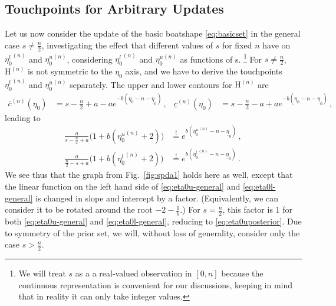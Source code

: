 \documentclass[runningheads,a4paper]{llncs}
\newcommand{\un}{^{(n)}} %
\newcommand{\ul}[1]{\underline{#1}}
\newcommand{\ol}[1]{\overline{#1}}
\def\ynl{\ul{y}\un}
\def\ynu{\ol{y}\un}
\def\EN{\mathrm{H}\un}
\newcommand{\ez}{\eta_0}
\def\ezl{\ul{\eta}_0}
\begin{document}
\subsection{Touchpoints for Arbitrary Updates}
\label{sec:generalupdate}

Let us now consider the update of the basic boatshape \eqref{eq:basicset} %
in the general case $s \neq \frac{n}{2}$,
investigating the effect that different values of $s$ for fixed $n$ have
on ${\eta_0^l}\un$ and ${\eta_0^u}\un$, %
considering ${\eta_0^l}\un$ and ${\eta_0^u}\un$ as functions of s.%
\footnote{We will treat $s$ as a a real-valued observation in $[0,n]$
because the continuous representation is convenient for our discussions,
keeping in mind that in reality it can only take integer values.}
For $s \neq \frac{n}{2}$, $\EN$ is not symmetric to the $\ez$ axis,
and we have to derive the touchpoints ${\eta_0^l}\un$ and ${\eta_0^u}\un$ separately.
%
The upper and lower contours for $\EN$ are
\begin{align*}
\ol{c}\un(\eta_0)                   &= s - \frac{n}{2} + a - a e^{-b(\eta_0 - n - \ezl)} \,, &
\ul{c}\un(\eta_0)                   &= s - \frac{n}{2} - a + a e^{-b(\eta_0 - n - \ezl)} \,,
\end{align*}
leading to
\begin{align}
\label{eq:eta0u-general}
\frac{a}{s - \frac{n}{2} + a} \big(1 + b({\eta_0^u}\un + 2)\big) &\stackrel{!}{=} e^{b({\eta_0^u}\un - n - \ezl)} \,,\\
\label{eq:eta0l-general}
\frac{a}{\frac{n}{2} -s  + a} \big(1 + b({\eta_0^l}\un + 2)\big) &\stackrel{!}{=} e^{b({\eta_0^l}\un - n - \ezl)} \,.
\end{align}
We see thus that the graph from Fig.~\ref{fig:spda1} holds here as well,
except that the linear function on the left hand side of 
\eqref{eq:eta0u-general} and \eqref{eq:eta0l-general} is changed in slope and intercept by a factor.
(Equivalently, we can consider it to be rotated around the root $-2-\frac{1}{b}$.)
For $s=\frac{n}{2}$, this factor is 1 for both \eqref{eq:eta0u-general} and \eqref{eq:eta0l-general},
reducing to \eqref{eq:eta0uposterior}.
Due to symmetry of the prior set, we will, without loss of generality,
consider only the case $s > \frac{n}{2}$.
\end{document}
